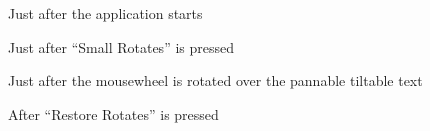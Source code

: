 \begin{figure}
\begin{center}
\caption{Just after the application starts}
\label{Medium-1}
\end{center}
\end{figure}

\begin{figure}
\begin{center}
\end{center}
\caption{Just after ``Small Rotates'' is pressed}
\label{Medium-2}
\end{figure}


\begin{figure}
\begin{center}
\end{center}
\caption{Just after the mousewheel is rotated over the pannable tiltable text}
\label{Medium-3}
\end{figure}


\begin{figure}
\begin{center}
\end{center}
\caption{After ``Restore Rotates'' is pressed}
\label{Medium-4}
\end{figure}
